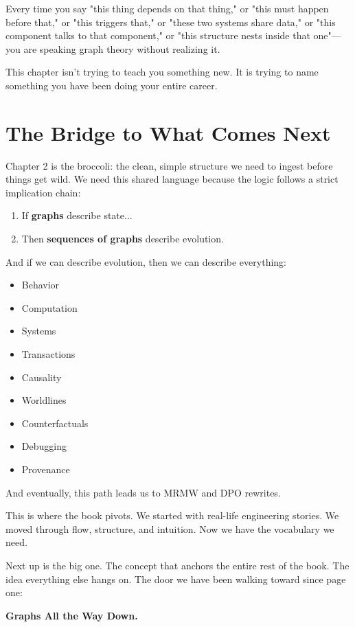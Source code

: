 Every time you say "this thing depends on that thing," or "this must happen before that," or "this triggers that," or "these two systems share data," or "this component talks to that component," or "this structure nests inside that one"—you are speaking graph theory without realizing it.

This chapter isn't trying to teach you something new. It is trying to name something you have been doing your entire career.

\section{The Bridge to What Comes Next}
\label{sec:bridge-next}

Chapter 2 is the broccoli: the clean, simple structure we need to ingest before things get wild. We need this shared language because the logic follows a strict implication chain:

\begin{enumerate}
    \item If \textbf{graphs} describe state...
    \item Then \textbf{sequences of graphs} describe evolution.
\end{enumerate}

And if we can describe evolution, then we can describe everything:
\begin{itemize}
    \item Behavior
    \item Computation
    \item Systems
    \item Transactions
    \item Causality
    \item Worldlines
    \item Counterfactuals
    \item Debugging
    \item Provenance
\end{itemize}

And eventually, this path leads us to MRMW and DPO rewrites.

This is where the book pivots. We started with real-life engineering stories. We moved through flow, structure, and intuition. Now we have the vocabulary we need.

Next up is the big one. The concept that anchors the entire rest of the book. The idea everything else hangs on. The door we have been walking toward since page one:

\textbf{Graphs All the Way Down.}
